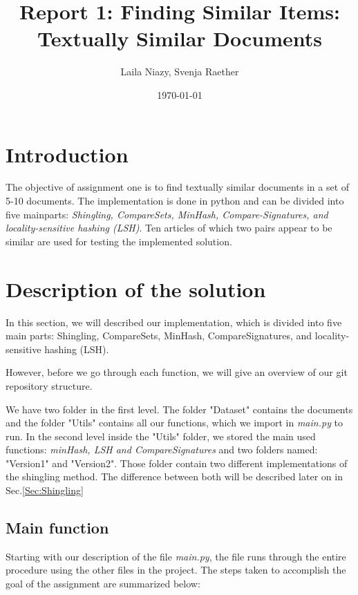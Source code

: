 \documentclass[a4paper, 11pt]{article}
\title{Report 1: Finding Similar Items: Textually Similar Documents}
\author{Laila Niazy, Svenja Raether}
\date{\today{}}
\begin{document}
\maketitle

\section{Introduction}

The objective of assignment one is to find textually similar documents in a set of 5-10 documents. The implementation is done in python and can be divided into five mainparts: \textit{Shingling, CompareSets, MinHash, Compare-Signatures, and locality-sensitive hashing (LSH)}. Ten articles of which two pairs appear to be similar are used for testing the implemented solution.


\section{Description of the solution}

In this section, we will described our implementation, which is divided into five main parts: Shingling, CompareSets, MinHash, CompareSignatures, and locality-sensitive hashing (LSH). \newline

However, before we go through each function, we will give an overview of our git repository structure.

We have two folder in the first level. The folder "Dataset" contains the documents  and the folder "Utils" contains all our functions, which we import in \textit{main.py} to run.
In the second level inside the "Utils" folder, we stored the main used functions: \textit{minHash, LSH and CompareSignatures} and two folders named: "Version1" and "Version2". Those folder contain two different implementations of the shingling method. The difference between both will be described later on in Sec.\ref{Sec:Shingling}
  
\subsection{Main function}
Starting with our description of the file \textit{main.py}, the file runs through the entire procedure using the other files in the project. The steps taken to accomplish the goal of the assignment are summarized below: 
 
\end{document}
